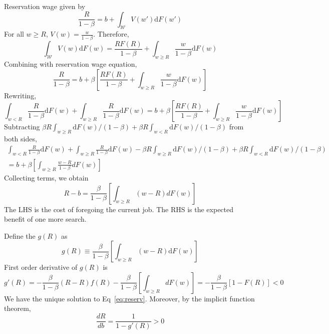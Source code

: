\documentclass[11pt,a4paper]{article}
\begin{document}
Reservation wage given by $$ \frac{R}{1-\beta} =  b+\int_{\mathcal{W}} V(w')\mathrm{d}F(w') $$
For all $w\geq R$, $V(w) = \frac{w}{1-\beta}$.
Therefore, $$ \int_{\mathcal{W}}V(w)\mathrm{d}F(w) = \frac{R F(R)}{1-\beta} +\int_{w\geq R}\frac{w}{1-\beta} \mathrm{d}F(w) $$
Combining with reservation wage equation, $$ \frac{R}{1-\beta} = b +\beta \left[\frac{R F(R)}{1-\beta} +\int_{w\geq R} \frac{w}{1-\beta}\mathrm{d}F(w)\right] $$
Rewriting, $$ \int_{w<R} \frac{R}{1-\beta} \mathrm{d}F(w) + \int_{w\geq R}\frac{R}{1-\beta}\mathrm{d}F(w) = b +\beta \left[\frac{R F(R)}{1-\beta} +\int_{w\geq R} \frac{w}{1-\beta}\mathrm{d}F(w)\right] $$
Subtracting $\beta R \int_{w\geq R} \mathrm{d}F(w)/(1-\beta)+\beta R \int_{w< R} \mathrm{d}F(w)/(1-\beta)$ from both sides,
$$ \begin{aligned}
    \int_{w<R} \frac{R}{1-\beta} \mathrm{d}F(w) + \int_{w\geq R}\frac{R}{1-\beta}\mathrm{d}F(w)-\beta R \int_{w\geq R} \mathrm{d}F(w)/(1-\beta)+\beta R \int_{w< R} \mathrm{d}F(w)/(1-\beta)\\ =  b+\beta\left[\int_{w\geq R}\frac{w-R}{1-\beta}d F(w)\right] 
\end{aligned}$$
Collecting terms, we obtain
\begin{equation}
    R- b = \frac{\beta}{1-\beta}\left[\int_{w\geq R}(w-R)d F(w)\right] \label{eq:reserv}
\end{equation}
The LHS is the cost of foregoing the current job. 
The RHS is the expected benefit of one more search.

Define the $g(R)$ as $$ g(R)\equiv \frac{\beta}{1-\beta}\left[\int_{w\geq R}(w-R)\mathrm{d}F(w)\right] $$
First order derivative of $g(R)$ is $$ g'(R) = -\frac{\beta}{1-\beta}(R-R)f(R)-\frac{\beta}{1-\beta}\left[\int_{w\geq R}dF(w)\right]= -\frac{\beta}{1-\beta}[1-F(R)]<0 $$ We have the unique solution to Eq~\eqref{eq:reserv}. 
Moreover, by the implicit function theorem, $$ \frac{dR}{db}= \frac{1}{1-g'(R)}>0 $$


\end{document}
